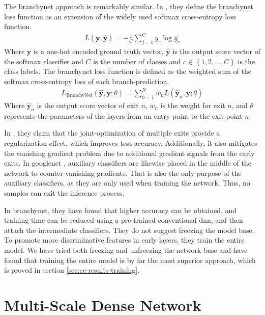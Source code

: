 The \gls{branchynet} approach is remarkably similar. In \cite{teerapittayanon_branchynet:_2016}, they define the \gls{branchynet} loss function as an extension of the widely used softmax cross-entropy loss function.
\begin{align}
L\left(\bm{y},\hat{\bm{y}}\right) = - \frac{1}{C} \sum_{j =1}^{C} y_c \log \hat{y}_c
\end{align}
Where $ \bm{y} $ is a one-hot encoded ground truth vector, $ \bm{\hat{y}} $ is the output score vector of the softmax classifier and $ C $ is the number of classes and $ c \in \left\{1, 2,  \dots, C\right\} $ is the class labels.
The \gls{branchynet} loss function is defined as the weighted sum of the softmax cross-entropy loss of each branch-prediction. 
\begin{align}
L_{\mathrm{BranchyNet}}(\hat{\bm{y}},\bm{y};\theta) = \sum_{n=1}^{N} w_n L \left(\hat{\bm{y}}_{n},\bm{y};\theta\right)
\end{align}
Where $ \bm{\hat{y}}_n $ is the output score vector of exit $ n $, $ w_n $ is the weight for exit $ n $, and $ \theta $ represents the parameters of the layers from an entry point to the exit point $ n $.

In \cite{teerapittayanon_branchynet:_2016}, they claim that the joint-optimization of multiple exits provide a regularization effect, which improves test accuracy. Additionally, it also mitigates the vanishing gradient problem due to additional gradient signals from the early exits.  In \gls{googlenet} \cite{szegedy_going_2015}, auxiliary classifiers are likewise placed in the middle of the network to counter vanishing gradients. That is also the only purpose of the auxiliary classifiers, as they are only used when training the network. Thus, no samples can exit the inference process. 

In \gls{branchynet}, they have found that higher accuracy can be obtained, and training time can be reduced using a pre-trained conventional \gls{dnn}, and then attach the intermediate classifiers. They do not suggest freezing the model base. To promote more discriminative features in early layers, they train the entire model. We have tried both freezing and unfreezing the network base and have found that training the entire model is by far the most superior approach, which is proved in section \ref{sec:ee-results-training}.

\section{Multi-Scale Dense Network} \label{sec:ee-msdnet}

